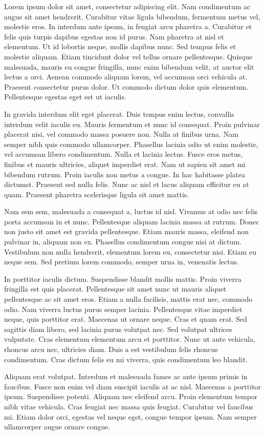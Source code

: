 Lorem ipsum dolor sit amet, consectetur adipiscing elit. Nam condimentum ac augue sit amet hendrerit. Curabitur vitae ligula bibendum, fermentum metus vel, molestie eros. In interdum ante ipsum, in feugiat arcu pharetra a. Curabitur et felis quis turpis dapibus egestas non id purus. Nam pharetra at nisl et elementum. Ut id lobortis neque, mollis dapibus nunc. Sed tempus felis et molestie aliquam. Etiam tincidunt dolor vel tellus ornare pellentesque. Quisque malesuada, mauris eu congue fringilla, nunc enim bibendum velit, at auctor elit lectus a orci. Aenean commodo aliquam lorem, vel accumsan orci vehicula at. Praesent consectetur purus dolor. Ut commodo dictum dolor quis elementum. Pellentesque egestas eget est ut iaculis.

In gravida interdum elit eget placerat. Duis tempus enim lectus, convallis interdum velit iaculis eu. Mauris fermentum et nunc id consequat. Proin pulvinar placerat nisi, vel commodo massa posuere non. Nulla at finibus urna. Nam semper nibh quis commodo ullamcorper. Phasellus lacinia odio ut enim molestie, vel accumsan libero condimentum. Nulla et lacinia lectus. Fusce eros metus, finibus et mauris ultricies, aliquet imperdiet erat. Nam ut sapien sit amet mi bibendum rutrum. Proin iaculis non metus a congue. In hac habitasse platea dictumst. Praesent sed nulla felis. Nunc ac nisl et lacus aliquam efficitur eu at quam. Praesent pharetra scelerisque ligula sit amet mattis.

Nam sem sem, malesuada a consequat a, luctus id nisl. Vivamus at odio nec felis porta accumsan in et nunc. Pellentesque aliquam lacinia massa at rutrum. Donec non justo sit amet est gravida pellentesque. Etiam mauris massa, eleifend non pulvinar in, aliquam non ex. Phasellus condimentum congue nisi at dictum. Vestibulum non nulla hendrerit, elementum lorem eu, consectetur nisi. Etiam eu neque sem. Sed pretium lorem commodo, semper urna in, venenatis lectus.

In porttitor iaculis dictum. Suspendisse blandit mollis mattis. Proin viverra fringilla est quis placerat. Pellentesque sit amet nunc ut mauris aliquet pellentesque ac sit amet eros. Etiam a nulla facilisis, mattis erat nec, commodo odio. Nam viverra luctus purus semper lacinia. Pellentesque vitae imperdiet neque, quis porttitor erat. Maecenas ut ornare neque. Cras et quam erat. Sed sagittis diam libero, sed lacinia purus volutpat nec. Sed volutpat ultrices vulputate. Cras elementum elementum arcu et porttitor. Nunc ut ante vehicula, rhoncus arcu nec, ultricies diam. Duis a est vestibulum felis rhoncus condimentum. Cras dictum felis eu mi viverra, quis condimentum leo blandit.

Aliquam erat volutpat. Interdum et malesuada fames ac ante ipsum primis in faucibus. Fusce non enim vel diam suscipit iaculis at ac nisl. Maecenas a porttitor ipsum. Suspendisse potenti. Aliquam nec eleifend arcu. Proin elementum tempor nibh vitae vehicula. Cras feugiat nec massa quis feugiat. Curabitur vel faucibus mi. Etiam dolor orci, egestas vel neque eget, congue tempor ipsum. Nam semper ullamcorper augue ornare congue.